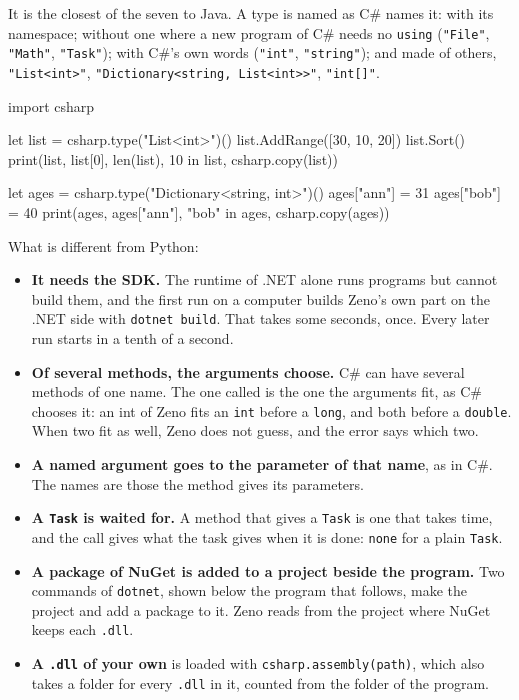 It is the closest of the seven to Java. A type is named as C\# names
it: with its namespace; without one where a new program of C\# needs
no \verb|using| (\verb|"File"|, \verb|"Math"|, \verb|"Task"|); with
C\#'s own words (\verb|"int"|, \verb|"string"|); and made of others,
\verb|"List<int>"|, \verb|"Dictionary<string, List<int>>"|,
\verb|"int[]"|.

\begin{zeno}[file=collections.zeno, dir=csharp]
import csharp

let list = csharp.type("List<int>")()
list.AddRange([30, 10, 20])
list.Sort()
print(list, list[0], len(list), 10 in list, csharp.copy(list))

let ages = csharp.type("Dictionary<string, int>")()
ages["ann"] = 31
ages["bob"] = 40
print(ages, ages["ann"], "bob" in ages, csharp.copy(ages))
\end{zeno}

What is different from Python:

\begin{itemize}
\item \textbf{It needs the SDK.} The runtime of .NET alone runs
  programs but cannot build them, and the first run on a computer
  builds Zeno's own part on the .NET side with \verb|dotnet build|.
  That takes some seconds, once. Every later run starts in a tenth of
  a second.
\item \textbf{Of several methods, the arguments choose.} C\# can have
  several methods of one name. The one called is the one the arguments
  fit, as C\# chooses it: an int of Zeno fits an \verb|int| before a
  \verb|long|, and both before a \verb|double|. When two fit as well,
  Zeno does not guess, and the error says which two.
\item \textbf{A named argument goes to the parameter of that name},
  as in C\#. The names are those the method gives its parameters.
\item \textbf{A \texttt{Task} is waited for.} A method that gives a
  \verb|Task| is one that takes time, and the call gives what the task
  gives when it is done: \verb|none| for a plain \verb|Task|.
\item \textbf{A package of NuGet is added to a project beside the
  program.} Two commands of \verb|dotnet|, shown below the program
  that follows, make the project and add a package to it. Zeno reads
  from the project where NuGet keeps each \verb|.dll|.
\item \textbf{A \texttt{.dll} of your own} is loaded with
  \verb|csharp.assembly(path)|, which also takes a folder for every
  \verb|.dll| in it, counted from the folder of the program.
\end{itemize}

